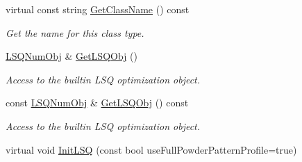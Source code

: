\begin{DoxyCompactItemize}
\mbox{\label{class_obj_cryst_1_1_monte_carlo_obj_a4a7c01d648dd833aa9f596b37aa337be}} 
virtual const string \mbox{\hyperlink{class_obj_cryst_1_1_monte_carlo_obj_a4a7c01d648dd833aa9f596b37aa337be}{Get\+Class\+Name}} () const
\begin{DoxyCompactList}\small\item\em Get the name for this class type. \end{DoxyCompactList}\item 
\mbox{\label{class_obj_cryst_1_1_monte_carlo_obj_ae1607ed98bb6ec0707659bfcf084838e}} 
\mbox{\hyperlink{class_obj_cryst_1_1_l_s_q_num_obj}{L\+S\+Q\+Num\+Obj}} \& \mbox{\hyperlink{class_obj_cryst_1_1_monte_carlo_obj_ae1607ed98bb6ec0707659bfcf084838e}{Get\+L\+S\+Q\+Obj}} ()
\begin{DoxyCompactList}\small\item\em Access to the builtin L\+SQ optimization object. \end{DoxyCompactList}\item 
\mbox{\label{class_obj_cryst_1_1_monte_carlo_obj_a05d97046a898f798430571715b4d1afa}} 
const \mbox{\hyperlink{class_obj_cryst_1_1_l_s_q_num_obj}{L\+S\+Q\+Num\+Obj}} \& \mbox{\hyperlink{class_obj_cryst_1_1_monte_carlo_obj_a05d97046a898f798430571715b4d1afa}{Get\+L\+S\+Q\+Obj}} () const
\begin{DoxyCompactList}\small\item\em Access to the builtin L\+SQ optimization object. \end{DoxyCompactList}\item 
virtual void \mbox{\hyperlink{class_obj_cryst_1_1_monte_carlo_obj_acd2853f973a5b26b5fac47e3152aec4b}{Init\+L\+SQ}} (const bool use\+Full\+Powder\+Pattern\+Profile=true)
\end{DoxyCompactItemize}
